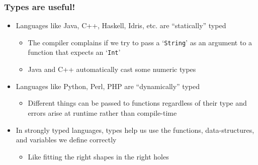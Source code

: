 \documentclass{beamer}
\begin{document}
  \begin{frame}
    \frametitle{Types are useful!}

    \begin{itemize}
      \item Languages like Java, C++, Haskell, Idris, etc. are ``statically''
      typed
      \begin{itemize}
        \item The compiler complains if we try to pass a `\texttt{String}' as an
        argument to a function that expects an `\texttt{Int}'
        \item Java and C++ automatically cast some numeric types
      \end{itemize}
      \item Languages like Python, Perl, PHP are ``dynamically'' typed
      \begin{itemize}
        \item Different things can be passed to functions regardless of their
        type and errors arise at runtime rather than compile-time
      \end{itemize}
      \item In strongly typed languages, types help us use the functions,
      data-structures, and variables we define correctly
      \begin{itemize}
        \item Like fitting the right shapes in the right holes
      \end{itemize}
    \end{itemize}

  \end{frame}
\end{document}
